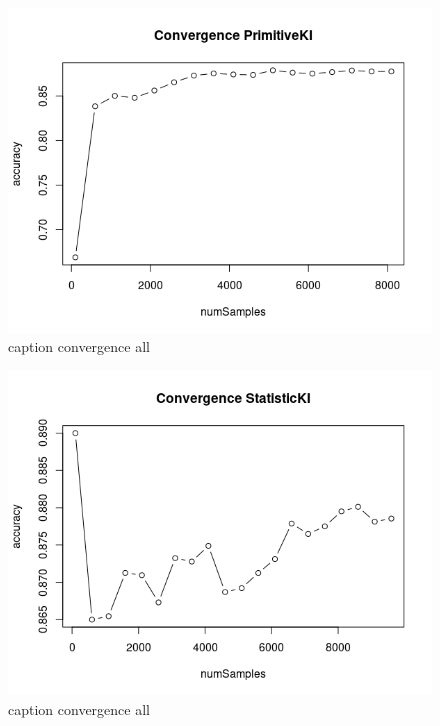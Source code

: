 \documentclass[11pt]{article}
\newcommand\BibTeX{B{\sc ib}\TeX}
\begin{document}
\begin{figure}[H]
	\centering
	\includegraphics[width=.45\textwidth]{../testdata/conv_prim.png}
	\caption{caption convergence all}
	\label{fig:conv_prim}
\end{figure}
\begin{figure}[H]
	\centering
	\includegraphics[width=.45\textwidth]{../testdata/conv_stat.png}
	\caption{caption convergence all}
	\label{fig:conv_stat}
\end{figure}


\end{document}
